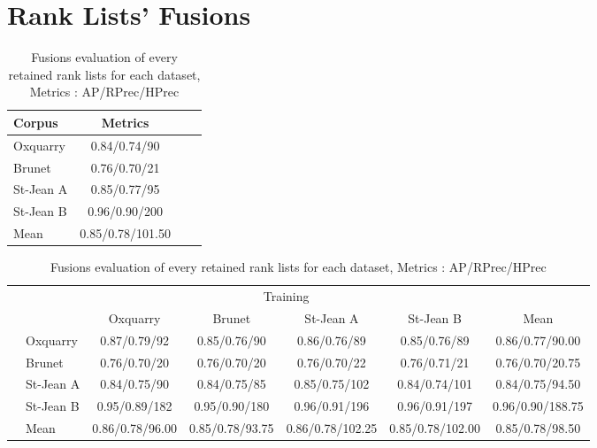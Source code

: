 \section{Rank Lists' Fusions}

\begin{table}[H]
  \centering
  \caption{Fusions evaluation of every retained rank lists for each dataset, Metrics : AP/RPrec/HPrec}
  \label{tab:fusions_scores}

  \begin{tabular}{l c c c}
    \toprule
    Corpus         & Metrics \\
    \midrule
    Oxquarry       & 0.84/0.74/90 \\
    Brunet         & 0.76/0.70/21 \\
    St-Jean A      & 0.85/0.77/95 \\
    St-Jean B      & 0.96/0.90/200 \\
    \midrule
    Mean           & 0.85/0.78/101.50 \\
    \bottomrule
  \end{tabular}

  \vspace{0.5cm}

  \begin{tabular}{l l| c c c c|c}
    \toprule
    \multicolumn{2}{c}{\multirow{2}{*}{}} & \multicolumn{4}{c}{Training} \\
    \multicolumn{2}{c}{} & Oxquarry & Brunet & St-Jean A & St-Jean B & Mean \\
    \midrule
    \parbox[t]{2mm}{}
    & Oxquarry  & 0.87/0.79/92 & 0.85/0.76/90 & 0.86/0.76/89 & 0.85/0.76/89 & 0.86/0.77/90.00 \\
    & Brunet    & 0.76/0.70/20 & 0.76/0.70/20 & 0.76/0.70/22 & 0.76/0.71/21 & 0.76/0.70/20.75 \\
    & St-Jean A & 0.84/0.75/90 & 0.84/0.75/85 & 0.85/0.75/102 & 0.84/0.74/101 & 0.84/0.75/94.50 \\
    & St-Jean B & 0.95/0.89/182 & 0.95/0.90/180 & 0.96/0.91/196 & 0.96/0.91/197 & 0.96/0.90/188.75 \\
    \midrule
    & Mean      & 0.86/0.78/96.00 & 0.85/0.78/93.75 & 0.86/0.78/102.25 & 0.85/0.78/102.00 & 0.85/0.78/98.50 \\
    \bottomrule
  \end{tabular}

\end{table}
